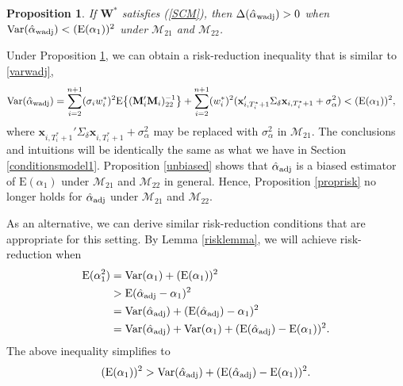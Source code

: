 \documentclass[11pt,3p,review,authoryear]{elsarticle}
\def\mbf#1{\mathbf{#1}} %
\def\mrm#1{\mathrm{#1}} %
\def\mc#1{\mathcal{#1}} %
\def\E#1{\mathrm{E}(#1)} %
\def\var#1{\mathrm{Var}(#1)} %
\newtheorem{prop}{Proposition}
\theoremstyle{definition}
\begin{document}
\begin{prop}
\label{propriskwadj2} If $\mbf{W}^*$ satisfies (\ref{SCM}), then $\Delta(\hat\alpha_{\rm wadj}) > 0$ when $\var{\hat{\alpha}_{\rm wadj}}<(\E{\alpha_1})^2$  under $\mc{M}_{21}$ and $\mc{M}_{22}$. 
\end{prop}
Under Proposition \ref{propriskwadj2}, we can obtain a risk-reduction inequality that is similar to \eqref{varwadj},
\begin{align*}
\var{\hat{\alpha}_{\rm wadj}}
& =\sum_{i=2}^{n+1}(\sigma_i w_i^*)^2\mrm{E}\big\{(\mbf{M}'_i\mbf{M}_i)^{-1}_{22}\big\} + \sum_{i=2}^{n+1} (w_i^*)^2 (\mbf{x}_{i, T_i^*+1}'\Sigma_{\delta}\mbf{x}_{i, T_i^*+1} + \sigma^2_{\alpha}) < (\E{\alpha_1})^2,
\end{align*}
where $\mbf{x}_{i, T_i^*+1}'\Sigma_{\delta}\mbf{x}_{i, T_i^*+1} + \sigma^2_{\alpha}$ may be replaced with $\sigma^2_{\alpha}$ in $\mc{M}_{21}$. The conclusions and intuitions will be identically the same as what we have in Section \ref{conditionsmodel1}. Proposition \ref{unbiased} shows that $\hat{\alpha}_{\rm adj}$ is a biased estimator of $\E{\alpha_1}$ under $\mc{M}_{21}$ and $\mc{M}_{22}$ in general. Hence, Proposition \ref{proprisk} no longer holds for $\hat{\alpha}_{\rm adj}$ under $\mc{M}_{21}$ and $\mc{M}_{22}$.

As an alternative, we can derive similar risk-reduction conditions that are appropriate for this setting. By Lemma \ref{risklemma}, we will achieve risk-reduction when
\begin{align*}
 \E{\alpha_1^2} &= \var{\alpha_1}+(\E{\alpha_1})^2\\
 &>\E{\hat{\alpha}_{\rm adj}-\alpha_1}^2\\
  &=\var{\hat{\alpha}_{\rm adj}} +  (\E{\hat{\alpha}_{\rm adj}}-\alpha_1)^2 \\
  &=\var{\hat{\alpha}_{\rm adj}} +  \var{\alpha_1} + (\E{\hat{\alpha}_{\rm adj}}-\E{\alpha_1})^2.
\end{align*}
The above inequality simplifies to 
\begin{equation} \label{ineq}
 (\E{\alpha_1})^2 >\var{\hat{\alpha}_{\rm adj}}+ (\E{\hat{\alpha}_{\rm adj}}-\E{\alpha_1})^2.
\end{equation}
\end{document}
